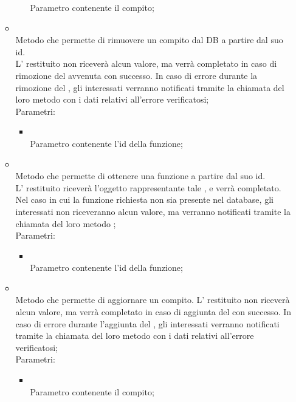 \begin{itemize}
\begin{itemize}
\begin{itemize}
			Parametro contenente il compito;
		\end{itemize}
		\item[]  \\
		Metodo che permette di rimuovere un compito dal DB a partire dal suo id. \\ L' restituito non riceverà alcun valore, ma verrà completato in caso di rimozione del  avvenuta con successo. In caso di errore durante la rimozione del , gli  interessati verranno notificati tramite la chiamata del loro metodo  con i dati relativi all'errore verificatosi;\\
		Parametri:
		\begin{itemize}
			\item {} \\
			Parametro contenente l'id della funzione;
		\end{itemize}
		\item[]  \\
		Metodo che permette di ottenere una funzione a partire dal suo id. \\ L' restituito riceverà l'oggetto rappresentante tale , e verrà completato. Nel caso in cui la funzione richiesta non sia presente nel database, gli  interessati non riceveranno alcun valore, ma verranno notificati tramite la chiamata del loro metodo ;\\
		Parametri:
		\begin{itemize}
			\item {} \\
			Parametro contenente l'id della funzione;
		\end{itemize}
		\item[]  \\
		Metodo che permette di aggiornare un compito. L' restituito non riceverà alcun valore, ma verrà completato in caso di aggiunta del  con successo. In caso di errore durante l'aggiunta del , gli  interessati verranno notificati tramite la chiamata del loro metodo  con i dati relativi all'errore verificatosi;\\
		Parametri:
		\begin{itemize}
			\item {} \\
			Parametro contenente il compito;
		\end{itemize}
	\end{itemize}
\end{itemize}
\FloatBarrier

